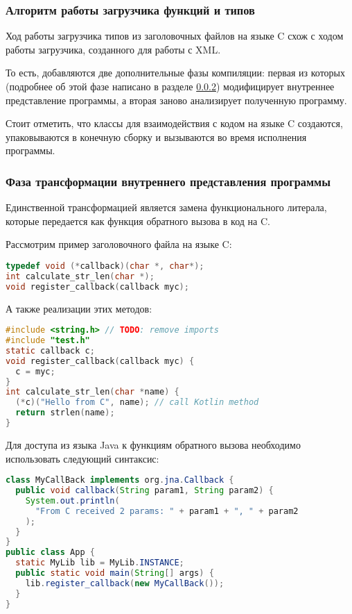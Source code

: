 \subsubsection{Алгоритм работы загрузчика функций и типов}

Ход работы загрузчика типов из заголовочных файлов на языке C схож с ходом работы загрузчика, созданного для работы с XML.

То есть, добавляются две дополнительные фазы компиляции: первая из которых (подробнее об этой фазе написано в разделе \ref{c-tranformation-phase}) модифицирует внутреннее представление программы, а вторая заново анализирует полученную программу.

Стоит отметить, что классы для взаимодействия с кодом на языке C создаются, упаковываются в конечную сборку и вызываются во время исполнения программы.

\subsubsection{Фаза трансформации внутреннего представления программы}\label{c-tranformation-phase}
Единственной трансформацией является замена функционального литерала, которые передается как функция обратного вызова в код на C.

Рассмотрим пример заголовочного файла на языке C:

\begin{lstlisting}[language=C]
typedef void (*callback)(char *, char*);
int calculate_str_len(char *);
void register_callback(callback myc);
\end{lstlisting}

А также реализации этих методов:
\begin{lstlisting}[language=C]
#include <string.h> // TODO: remove imports
#include "test.h"
static callback c;
void register_callback(callback myc) {
  c = myc;
}
int calculate_str_len(char *name) {
  (*c)("Hello from C", name); // call Kotlin method
  return strlen(name);
}
\end{lstlisting}

Для доступа из языка Java к функциям обратного вызова необходимо использовать следующий синтаксис:
\begin{lstlisting}[language=Java]
class MyCallBack implements org.jna.Callback {
  public void callback(String param1, String param2) {
    System.out.println(
      "From C received 2 params: " + param1 + ", " + param2
    );
  }
}
public class App {
  static MyLib lib = MyLib.INSTANCE;
  public static void main(String[] args) {
    lib.register_callback(new MyCallBack());
  }
}
\end{lstlisting}

